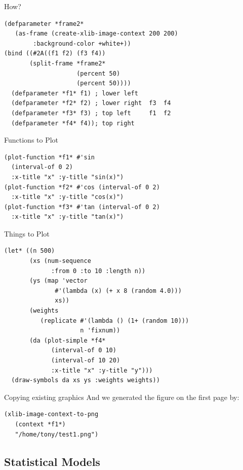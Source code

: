 \documentclass{beamer}
\begin{document}
\begin{frame}[fragile]{How?}
\begin{verbatim}
(defparameter *frame2*
   (as-frame (create-xlib-image-context 200 200)
   	    :background-color +white+))
(bind ((#2A((f1 f2) (f3 f4))
       (split-frame *frame2*
                    (percent 50)
                    (percent 50))))
  (defparameter *f1* f1) ; lower left   
  (defparameter *f2* f2) ; lower right  f3  f4
  (defparameter *f3* f3) ; top left     f1  f2
  (defparameter *f4* f4)); top right
\end{verbatim}
\end{frame}

\begin{frame}[fragile]{Functions to Plot}
\begin{verbatim}
(plot-function *f1* #'sin
  (interval-of 0 2)
  :x-title "x" :y-title "sin(x)")
(plot-function *f2* #'cos (interval-of 0 2)
  :x-title "x" :y-title "cos(x)")
(plot-function *f3* #'tan (interval-of 0 2)
  :x-title "x" :y-title "tan(x)")
\end{verbatim}
\end{frame}

\begin{frame}[fragile]{Things to Plot}
\small{
\begin{verbatim}
(let* ((n 500)
       (xs (num-sequence
             :from 0 :to 10 :length n))
       (ys (map 'vector
              #'(lambda (x) (+ x 8 (random 4.0)))
              xs))
       (weights
          (replicate #'(lambda () (1+ (random 10)))
                     n 'fixnum))
       (da (plot-simple *f4*
             (interval-of 0 10)
             (interval-of 10 20)
             :x-title "x" :y-title "y")))
  (draw-symbols da xs ys :weights weights))
\end{verbatim}
}
\end{frame}

\begin{frame}[fragile]{Copying existing graphics}
  And we generated the figure on the first page by:
\begin{verbatim}
(xlib-image-context-to-png
   (context *f1*)
   "/home/tony/test1.png")
\end{verbatim}
\end{frame}

\subsection{Statistical Models}
\label{sec:work:statmod}
\end{document}
